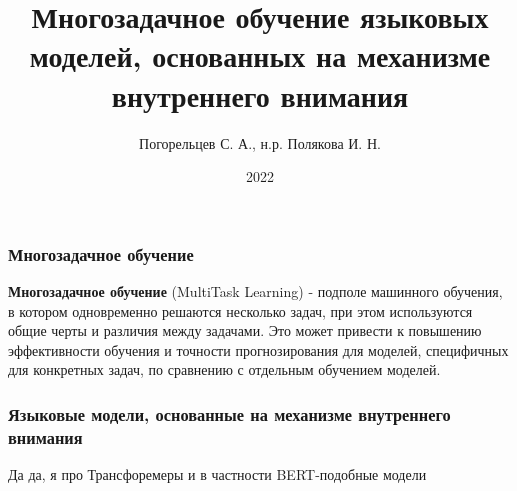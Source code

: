 \documentclass[aspectratio=169]{beamer}
\title{Многозадачное обучение языковых моделей, основанных на механизме внутреннего внимания}
\author{Погорельцев С. А., н.р. Полякова И. Н.}
\institute{МГУ им. Ломоносова, ф-т ВМК, каф. АЯ}
\date{2022}
\begin{document}
\frame{\titlepage}

\section[Многозадачное обучение]{}
 
\begin{frame}
	\frametitle{Многозадачное обучение}
	\textbf{Многозадачное обучение} (MultiTask Learning) - подполе машинного обучения, в котором одновременно решаются несколько задач, при этом используются общие черты и различия между задачами. Это может привести к повышению эффективности обучения и точности прогнозирования для моделей, специфичных для конкретных задач, по сравнению с отдельным обучением моделей.
\end{frame}

\begin{frame}
	\frametitle{Языковые модели, основанные на механизме внутреннего внимания}
	Да да, я про Трансфоремеры и в частности BERT-подобные модели
	\begin{columns}
				\begin{column}{0.2\textwidth}
			\begin{figure}

\end{figure}
\end{column}
\end{columns}
\end{frame}
\end{document}
